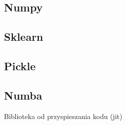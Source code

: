 \subsection{Numpy}

\subsection{Sklearn}

\subsection{Pickle}

\subsection{Numba}
Biblioteka od przyspieszania kodu (jit)